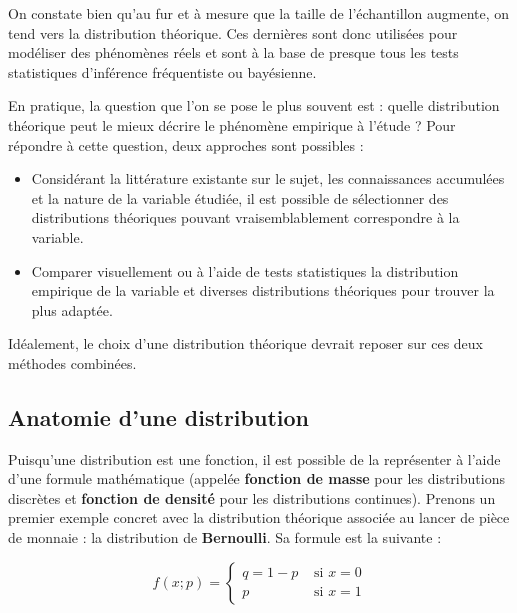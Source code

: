 \documentclass[
  11pt,
  french,
]{book}
\providecommand{\tightlist}{%
  \setlength{\itemsep}{0pt}\setlength{\parskip}{0pt}}
\begin{document}
On constate bien qu'au fur et à mesure que la taille de l'échantillon augmente, on tend vers la distribution théorique. Ces dernières sont donc utilisées pour modéliser des phénomènes réels et sont à la base de presque tous les tests statistiques d'inférence fréquentiste ou bayésienne.

En pratique, la question que l'on se pose le plus souvent est : quelle distribution théorique peut le mieux décrire le phénomène empirique à l'étude ? Pour répondre à cette question, deux approches sont possibles :

\begin{itemize}
\tightlist
\item
  Considérant la littérature existante sur le sujet, les connaissances accumulées et la nature de la variable étudiée, il est possible de sélectionner des distributions théoriques pouvant vraisemblablement correspondre à la variable.
\item
  Comparer visuellement ou à l'aide de tests statistiques la distribution empirique de la variable et diverses distributions théoriques pour trouver la plus adaptée.
\end{itemize}

Idéalement, le choix d'une distribution théorique devrait reposer sur ces deux méthodes combinées.

\hypertarget{anatomie-dune-distribution}{%
\subsection{Anatomie d'une distribution}\label{anatomie-dune-distribution}}

Puisqu'une distribution est une fonction, il est possible de la représenter à l'aide d'une formule mathématique (appelée \textbf{fonction de masse} pour les distributions discrètes et \textbf{fonction de densité} pour les distributions continues). Prenons un premier exemple concret avec la distribution théorique associée au lancer de pièce de monnaie : la distribution de \textbf{Bernoulli}. Sa formule est la suivante :

\footnotesize

\begin{equation} f(x ; p)=\left\{\begin{array}{ll}
q=1-p & \text { si } x=0 \\
p & \text { si } x=1
\end{array}\right.
\label{eq:Bernoulli}
\end{equation}
\normalsize
\end{document}

